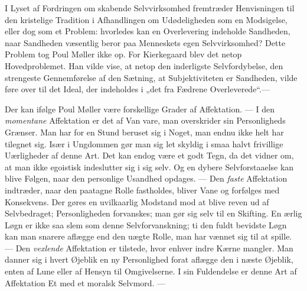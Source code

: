 \documentclass[12pt,a4paper,openany]{book}
\newcommand{\opage}[1]{\marginnote{\footnotesize\textit{[#1]}}}
\begin{document}
I Lyset af Fordringen om skabende Selvvirksomhed fremtræder Henvisningen til
den kristelige Tradition i Afhandlingen om Udødeligheden som en Modsigelse,
eller dog som et Problem: hvorledes kan en Overlevering indeholde Sandheden,
naar Sandheden væsentlig beror paa Menneskets egen Selvvirksomhed? Dette
Problem tog Poul Møller ikke op. For Kierkegaard blev det netop Hovedproblemet.
Han vilde vise, at netop den inderligste Selvfordybelse, den strengeste
Gennemførelse af den Sætning, at Subjektiviteten er Sandheden, vilde føre over
til det Ideal, der indeholdes i „det fra Fædrene Overleverede“.---

Der kan ifølge Poul Møller være forskellige Grader af Affektation. --- I den
\textit{momentane} Affektation er det af Van%
\setcounter{footnote}{0}%
\opage{126}vare, man overskrider sin Personligheds Grænser. Man har for en
Stund beruset sig i Noget, man endnu ikke helt har tilegnet sig. Især i
Ungdommen gør man sig let skyldig i smaa halvt frivillige Uærligheder af denne
Art. Det kan endog være et godt Tegn, da det vidner om, at man ikke egoistisk
indeslutter sig i sig selv. Og en dybere Selvforstaaelse kan blive Følgen, naar
den personlige Usandhed opdages. --- Den \textit{faste} Affektation indtræder,
naar den paatagne Rolle fastholdes, bliver Vane og forfølges med Konsekvens.
Der gøres en uvilkaarlig Modstand mod at blive reven ud af Selvbedraget;
Personligheden forvanskes; man gør sig selv til en Skifting. En ærlig Løgn er
ikke saa slem som denne Selvforvanskning; ti den fuldt bevidste Løgn kan man
snarere aflægge end den uægte Rolle, man har vænnet sig til at spille. --- Den
\textit{vexlende} Affektation er tilstede, hvor enhver indre Kærne mangler. Man
danner sig i hvert Øjeblik en ny Personlighed forat aflægge den i næste
Øjeblik, enten af Lune eller af Hensyn til Omgivelserne. I sin Fuldendelse er
denne Art af Affektation Et med et moralsk Selvmord. ---
\end{document}
